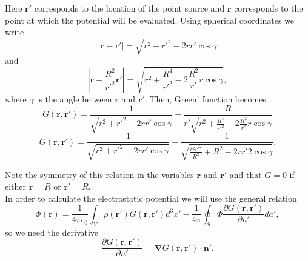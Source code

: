 Here $\textbf{r}'$ corresponds to the location of the point source and $\textbf{r}$ corresponds to the point at which the potential will be evaluated. Using spherical coordinates we write
\begin{equation}
\left| \textbf{r} - \textbf{r}' \right| = \sqrt{r^2 + r'^2 -2rr' \cos \gamma}
\end{equation}
and
\begin{equation}
\left| \textbf{r} -\frac{R^2}{r'^2} \textbf{r}' \right| = \sqrt{r^2 + \frac{R^4}{r'^2} - 2\frac{R^2}{r'} r \cos \gamma},
\end{equation}
where $\gamma$ is the angle between $\textbf{r}$ and $\textbf{r}'$. Then, Green' function becomes
\begin{equation}
G(\textbf{r} , \textbf{r}') = \frac{1}{\sqrt{r^2 + r'^2 -2rr' \cos \gamma}} -  \frac{R}{r'  \sqrt{r^2 + \frac{R^4}{r'^2} - 2\frac{R^2}{r'} r \cos \gamma}}
\end{equation}
\begin{equation}
G(\textbf{r} , \textbf{r}') = \frac{1}{\sqrt{r^2 + r'^2 -2rr' \cos \gamma}} -  \frac{1}{\sqrt{\frac{r^2 r'^2}{R^2} + R^2 - 2rr'2 \cos \gamma}}.
\end{equation}

Note the symmetry of this relation in the variables $\textbf{r}$ and $\textbf{r}'$ and that $G=0$ if either $\textbf{r}=R$ or $\textbf{r}'=R$.\\

In order to calculate the electrostatic potential we will use the general relation
\begin{equation}
 \Phi (\textbf{r}) = \frac{1}{4 \pi  \epsilon_0} \int_V \rho (\textbf{r}') G (\textbf{r}, \textbf{r}')  d^3x' -\frac{1}{4\pi} \oint_S   \Phi \frac{\partial G  (\textbf{r}, \textbf{r}')}{\partial n'}  da',
\end{equation}
so we need the derivative
\begin{equation}
\frac{\partial G  (\textbf{r}, \textbf{r}')}{\partial n'} = \boldsymbol{\nabla} G  (\textbf{r}, \textbf{r}') \cdot \textbf{n}'.
\end{equation}


